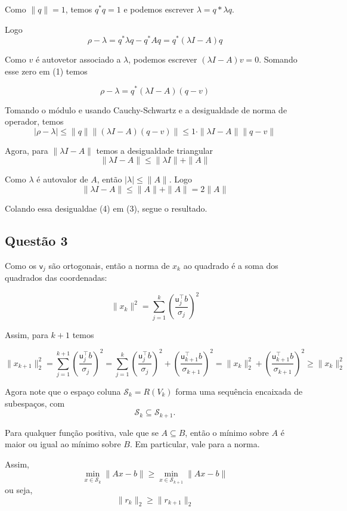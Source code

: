 \documentclass[11pt]{article}
\begin{document}
    Como \(\|q\| = 1\), temos \(q^*q =1\) e podemos escrever
\(\lambda = q*\lambda q\).

Logo
\[\tag{1}\rho - \lambda = q^*\lambda q - q^*Aq = q^*(\lambda I - A)q\]

Como \(v\) é autovetor associado a \(\lambda\), podemos escrever
\((\lambda I - A)v=0\). Somando esse zero em (1) temos

\[\rho - \lambda = q^*(\lambda I - A)(q-v) \tag{2}\]

Tomando o módulo e usando Cauchy-Schwartz e a desigualdade de norma de
operador, temos
\[|\rho-\lambda|\le \|q\|\|(\lambda I - A)(q-v)\| \le 1\cdot \|\lambda I - A\|\|q-v\| \tag{3}\]

Agora, para \(\|\lambda I - A\|\) temos a desigualdade triangular
\[\|\lambda I - A\| \le \|\lambda I\| + \|A\|\]

Como \(\lambda\) é autovalor de \(A\), então \(|\lambda|\le \|A\|\).
Logo \[\|\lambda I - A\| \le \|A\| + \|A\| = 2\|A\| \tag{4}\]

Colando essa desigualdae (4) em (3), segue o resultado.

    \hypertarget{questuxe3o-3}{%
\subsection*{Questão 3}\label{questuxe3o-3}}

    Como os \(\mathsf{v}_j\) são ortogonais, então a norma de \(x_k\) ao
quadrado é a soma dos quadrados das coordenadas:

\[\|x_k\|^2 = \sum_{j=1}^k \left(\frac{\mathsf{u}_j^\top b}{\sigma_j}\right)^2\]

Assim, para \(k+1\) temos

\[\|x_{k+1}\|^2_2 = \sum_{j=1}^{k+1} \left(\frac{\mathsf{u}_j^\top b}{\sigma_j}\right)^2 = \sum_{j=1}^{k} \left(\frac{\mathsf{u}_j^\top b}{\sigma_j}\right)^2 + \left(\frac{\mathsf{u}_{k+1}^\top b}{\sigma_{k+1}}\right)^2  = \|x_k\|^2_2 + \left(\frac{\mathsf{u}_{k+1}^\top b}{\sigma_{k+1}}\right)^2 \ge \|x_k\|^2_2\]

Agora note que o espaço coluna \(\mathcal{S}_k = R(V_k)\) forma uma
sequência encaixada de subespaços, com
\[\mathcal{S}_k\subseteq \mathcal{S}_{k+1}.\]

Para qualquer função positiva, vale que se \(A\subseteq B\), então o
mínimo sobre \(A\) é maior ou igual ao mínimo sobre \(B\). Em
particular, vale para a norma.

Assim,
\[\min_{x\in \mathcal{S}_{k}} \|Ax-b\| \ge \min_{x\in \mathcal{S}_{k+1}} \|Ax-b\|\]
ou seja, \[\|r_{k}\|_2 \ge \|r_{k+1}\|_2\]
\end{document}
